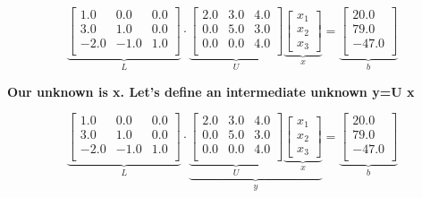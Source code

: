 \begin{equation}
\underbrace{\left[
\begin{array}{rrr}
1.0 & 0.0 & 0.0 \\
3.0 & 1.0 & 0.0 \\
-2.0 & -1.0 & 1.0 \\
\end{array}
\right]}_{L} \cdot \underbrace{\left[
\begin{array}{ccc}
2.0 & 3.0 & 4.0 \\
0.0 & 5.0 & 3.0 \\
0.0 & 0.0 & 4.0 \\
\end{array}
\right]}_{U} \underbrace{\left[\begin{array}{c} x_1 \\ x_2 \\x_3 \end{array}\right]}_{x}= 
\underbrace{\left[
\begin{array}{c}
20.0 \\
79.0 \\
-47.0 \\
\end{array}
\right]}_{b}
\end{equation}
\vspace*{2cm}

\textbf{\LARGE Our unknown is x. Let's define an intermediate unknown y=U x}

\vspace*{2cm}

\begin{equation}
\underbrace{\left[
\begin{array}{rrr}
1.0 & 0.0 & 0.0 \\
3.0 & 1.0 & 0.0 \\
-2.0 & -1.0 & 1.0 \\
\end{array}
\right]}_{L} \cdot \underbrace{ \underbrace{\left[
\begin{array}{ccc}
2.0 & 3.0 & 4.0 \\
0.0 & 5.0 & 3.0 \\
0.0 & 0.0 & 4.0 \\
\end{array}
\right]}_{U} \underbrace{\left[\begin{array}{c} x_1 \\ x_2 \\x_3 \end{array}\right]}_{x}}_{y}= 
\underbrace{\left[
\begin{array}{c}
20.0 \\
79.0 \\
-47.0 \\
\end{array}
\right]}_{b}
\end{equation}

